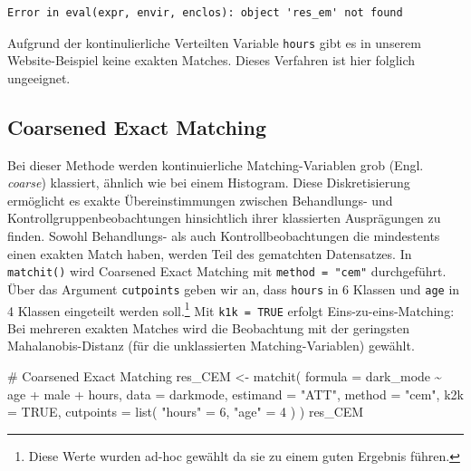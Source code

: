 \documentclass[
  a4paper,
  DIV=11,
  oneside]{scrreprt}
\newenvironment{Shaded}{\begin{snugshade}}{\end{snugshade}}
\newcommand{\AttributeTok}[1]{\textcolor[rgb]{0.40,0.45,0.13}{#1}}
\newcommand{\CommentTok}[1]{\textcolor[rgb]{0.37,0.37,0.37}{#1}}
\newcommand{\ConstantTok}[1]{\textcolor[rgb]{0.56,0.35,0.01}{#1}}
\newcommand{\DecValTok}[1]{\textcolor[rgb]{0.68,0.00,0.00}{#1}}
\newcommand{\FunctionTok}[1]{\textcolor[rgb]{0.28,0.35,0.67}{#1}}
\newcommand{\NormalTok}[1]{\textcolor[rgb]{0.00,0.23,0.31}{#1}}
\newcommand{\OtherTok}[1]{\textcolor[rgb]{0.00,0.23,0.31}{#1}}
\newcommand{\SpecialCharTok}[1]{\textcolor[rgb]{0.37,0.37,0.37}{#1}}
\newcommand{\StringTok}[1]{\textcolor[rgb]{0.13,0.47,0.30}{#1}}
\begin{document}
\begin{verbatim}
Error in eval(expr, envir, enclos): object 'res_em' not found
\end{verbatim}

Aufgrund der kontinulierliche Verteilten Variable \texttt{hours} gibt es
in unserem Website-Beispiel keine exakten Matches. Dieses Verfahren ist
hier folglich ungeeignet.

\hypertarget{coarsened-exact-matching}{%
\subsection{Coarsened Exact Matching}\label{coarsened-exact-matching}}

Bei dieser Methode werden kontinuierliche Matching-Variablen grob (Engl.
\emph{coarse}) klassiert, ähnlich wie bei einem Histogram. Diese
Diskretisierung ermöglicht es exakte Übereinstimmungen zwischen
Behandlungs- und Kontrollgruppenbeobachtungen hinsichtlich ihrer
klassierten Ausprägungen zu finden. Sowohl Behandlungs- als auch
Kontrollbeobachtungen die mindestents einen exakten Match haben, werden
Teil des gematchten Datensatzes. In \texttt{matchit()} wird Coarsened
Exact Matching mit \texttt{method\ =\ "cem"} durchgeführt. Über das
Argument \texttt{cutpoints} geben wir an, dass \texttt{hours} in 6
Klassen und \texttt{age} in 4 Klassen eingeteilt werden soll.\footnote{Diese
  Werte wurden ad-hoc gewählt da sie zu einem guten Ergebnis führen.}
Mit \texttt{k1k\ =\ TRUE} erfolgt Eins-zu-eins-Matching: Bei mehreren
exakten Matches wird die Beobachtung mit der geringsten
Mahalanobis-Distanz (für die unklassierten Matching-Variablen) gewählt.

\begin{Shaded}
\begin{Highlighting}[]
\CommentTok{\# Coarsened Exact Matching}
\NormalTok{res\_CEM }\OtherTok{\textless{}{-}} \FunctionTok{matchit}\NormalTok{(}
  \AttributeTok{formula =}\NormalTok{ dark\_mode }\SpecialCharTok{\textasciitilde{}}\NormalTok{ age }\SpecialCharTok{+}\NormalTok{ male }\SpecialCharTok{+}\NormalTok{ hours, }
  \AttributeTok{data =}\NormalTok{ darkmode, }
  \AttributeTok{estimand =} \StringTok{"ATT"}\NormalTok{,}
  \AttributeTok{method =} \StringTok{"cem"}\NormalTok{, }
  \AttributeTok{k2k =} \ConstantTok{TRUE}\NormalTok{,}
  \AttributeTok{cutpoints =} \FunctionTok{list}\NormalTok{(}
    \StringTok{"hours"} \OtherTok{=} \DecValTok{6}\NormalTok{, }
    \StringTok{"age"} \OtherTok{=} \DecValTok{4}
\NormalTok{  ) }
\NormalTok{)}
\NormalTok{res\_CEM}
\end{Highlighting}
\end{Shaded}
\end{document}
